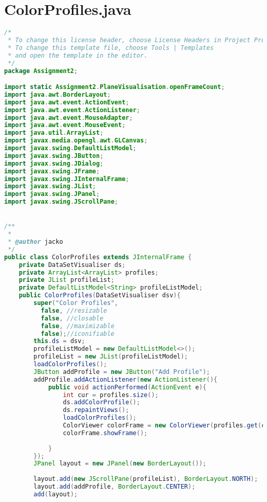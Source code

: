 \documentclass[pdftex,a4paper,10pt,titlepage]{article}
\begin{document}
\section{ColorProfiles.java}

\begin{lstlisting}[language=java, breaklines=true]
/*
 * To change this license header, choose License Headers in Project Properties.
 * To change this template file, choose Tools | Templates
 * and open the template in the editor.
 */
package Assignment2;

import static Assignment2.PlaneVisualisation.openFrameCount;
import java.awt.BorderLayout;
import java.awt.event.ActionEvent;
import java.awt.event.ActionListener;
import java.awt.event.MouseAdapter;
import java.awt.event.MouseEvent;
import java.util.ArrayList;
import javax.media.opengl.awt.GLCanvas;
import javax.swing.DefaultListModel;
import javax.swing.JButton;
import javax.swing.JDialog;
import javax.swing.JFrame;
import javax.swing.JInternalFrame;
import javax.swing.JList;
import javax.swing.JPanel;
import javax.swing.JScrollPane;


/**
 *
 * @author jacko
 */
public class ColorProfiles extends JInternalFrame {
    private DataSetVisualiser ds;
    private ArrayList<ArrayList> profiles;
    private JList profileList;
    private DefaultListModel<String> profileListModel;
    public ColorProfiles(DataSetVisualiser dsv){
        super("Color Profiles",
          false, //resizable
          false, //closable
          false, //maximizable
          false);//iconifiable
        this.ds = dsv;
        profileListModel = new DefaultListModel<>();
        profileList = new JList(profileListModel);
        loadColorProfiles();
        JButton addProfile = new JButton("Add Profile");
        addProfile.addActionListener(new ActionListener(){
            public void actionPerformed(ActionEvent e){
                int cur = profiles.size();
                ds.addColorProfile();
                ds.repaintViews();
                loadColorProfiles();
                ColorViewer colorFrame = new ColorViewer(profiles.get(cur), "Color Profile", ds);
                colorFrame.showFrame();
                
            }
        });
        JPanel layout = new JPanel(new BorderLayout());
        
        layout.add(new JScrollPane(profileList), BorderLayout.NORTH);
        layout.add(addProfile, BorderLayout.CENTER);
        add(layout);
        

\end{lstlisting}
\end{document}
